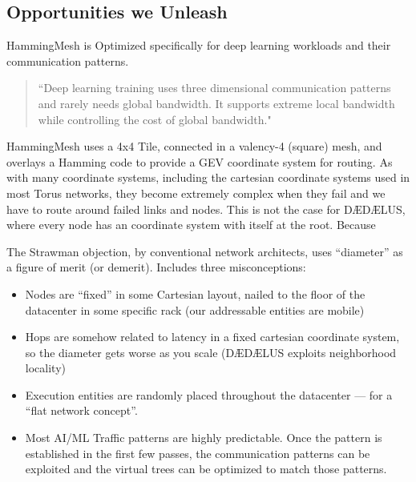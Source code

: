 \documentclass[../../../OAE-SPEC-MAIN.tex]{subfiles}
\begin{document}
\subsection{Opportunities we Unleash}

HammingMesh is Optimized specifically for deep learning workloads and their communication patterns.

\begin{quote}
“Deep learning training uses three dimensional communication patterns and rarely needs global bandwidth. It supports extreme local bandwidth while controlling the cost of global bandwidth."
\end{quote}

HammingMesh uses a 4x4 Tile, connected in a valency-4 (square) mesh, and overlays a Hamming code to provide a GEV coordinate system for routing.  As with many coordinate systems, including the cartesian coordinate systems used in most Torus networks, they become extremely complex when they fail and we have to route around failed links and nodes.  This is not the case for DÆDÆLUS, where every node has an  coordinate system with itself at the root. Because 

The Strawman objection, by conventional network architects, uses “diameter” as a figure of merit (or demerit). Includes three misconceptions:
\begin{itemize}
  \item Nodes are “fixed” in some Cartesian layout, nailed to the floor of the datacenter in some specific rack (our addressable entities are mobile)
  \item Hops are somehow related to latency in a fixed cartesian coordinate system, so the diameter gets worse as you scale (DÆDÆLUS exploits neighborhood locality)
  \item Execution entities are randomly placed throughout the datacenter — for a “flat network concept”. %
  \item Most AI/ML Traffic patterns are highly predictable. Once the pattern is established in the first few passes, the communication patterns can be exploited and the virtual trees can be optimized to match those patterns.
\end{itemize}
\end{document}
